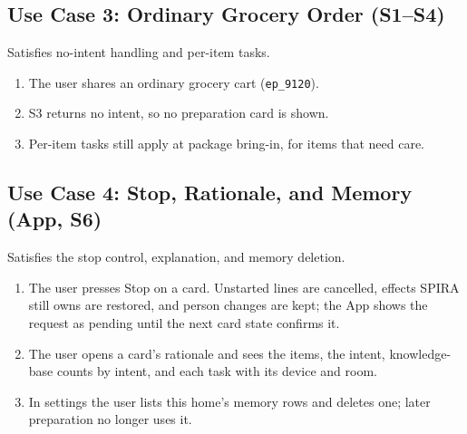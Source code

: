 \documentclass[conference]{IEEEtran}
\begin{document}
\subsection{Use Case 3: Ordinary Grocery Order (S1--S4)}
Satisfies no-intent handling and per-item tasks.
\begin{enumerate}
\item The user shares an ordinary grocery cart (\texttt{ep\_9120}).
\item S3 returns no intent, so no preparation card is shown.
\item Per-item tasks still apply at package bring-in, for items that need care.
\end{enumerate}

\subsection{Use Case 4: Stop, Rationale, and Memory (App, S6)}
Satisfies the stop control, explanation, and memory deletion.
\begin{enumerate}
\item The user presses Stop on a card. Unstarted lines are cancelled, effects SPIRA still owns are restored, and person changes are kept; the App shows the request as pending until the next card state confirms it.
\item The user opens a card's rationale and sees the items, the intent, knowledge-base counts by intent, and each task with its device and room.
\item In settings the user lists this home's memory rows and deletes one; later preparation no longer uses it.
\end{enumerate}
\end{document}
